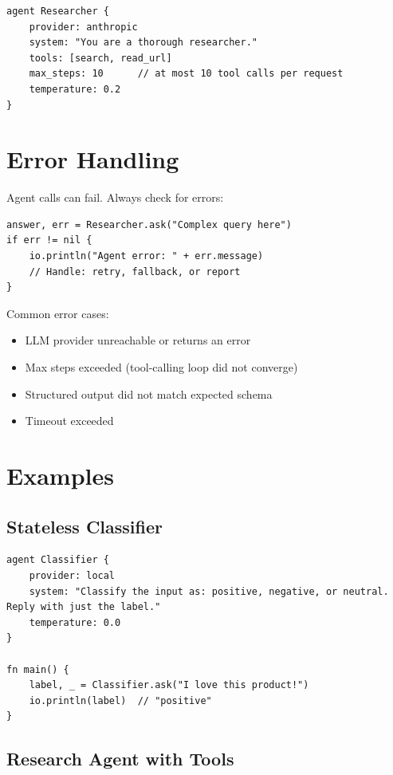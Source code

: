 \begin{lstlisting}
agent Researcher {
    provider: anthropic
    system: "You are a thorough researcher."
    tools: [search, read_url]
    max_steps: 10      // at most 10 tool calls per request
    temperature: 0.2
}
\end{lstlisting}

\section{Error Handling}

Agent calls can fail. Always check for errors:

\begin{lstlisting}
answer, err = Researcher.ask("Complex query here")
if err != nil {
    io.println("Agent error: " + err.message)
    // Handle: retry, fallback, or report
}
\end{lstlisting}

Common error cases:
\begin{itemize}
    \item LLM provider unreachable or returns an error
    \item Max steps exceeded (tool-calling loop did not converge)
    \item Structured output did not match expected schema
    \item Timeout exceeded
\end{itemize}

\section{Examples}

\subsection{Stateless Classifier}

\begin{lstlisting}
agent Classifier {
    provider: local
    system: "Classify the input as: positive, negative, or neutral. Reply with just the label."
    temperature: 0.0
}

fn main() {
    label, _ = Classifier.ask("I love this product!")
    io.println(label)  // "positive"
}
\end{lstlisting}

\subsection{Research Agent with Tools}

